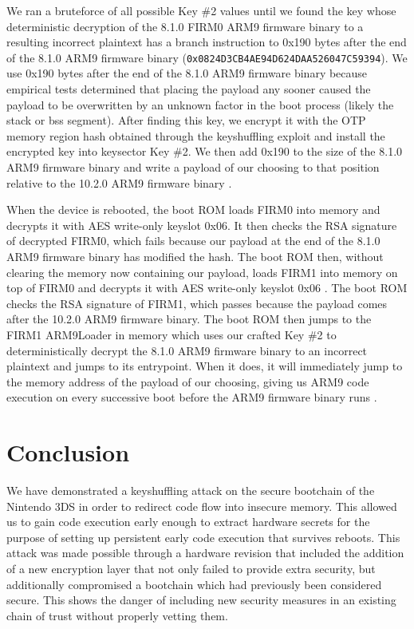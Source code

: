 \documentclass[journal]{IEEEtran}
\begin{document}
We ran a bruteforce of all possible Key \#2 values until we found the key whose
deterministic decryption of the 8.1.0 FIRM0 ARM9 firmware binary to a resulting
incorrect plaintext has a branch instruction to 0x190 bytes after the end of the
8.1.0 ARM9 firmware binary (\texttt{0x0824D3CB4AE94D624DAA526047C59394}). We use
0x190 bytes after the end of the 8.1.0 ARM9 firmware binary because empirical
tests determined that placing the payload any sooner caused the payload to be
overwritten by an unknown factor in the boot process (likely the stack or bss
segment). After finding this key, we encrypt it with the OTP memory region hash
obtained through the keyshuffling exploit and install the encrypted key into
keysector Key \#2. We then add 0x190 to the size of the 8.1.0 ARM9 firmware
binary and write a payload of our choosing to that position relative to the
10.2.0 ARM9 firmware binary \cite{32c3}.

When the device is rebooted, the boot ROM loads FIRM0 into memory and decrypts
it with AES write-only keyslot 0x06. It then checks the RSA signature of
decrypted FIRM0, which fails because our payload at the end of the 8.1.0 ARM9
firmware binary has modified the hash. The boot ROM then, without clearing the
memory now containing our payload, loads FIRM1 into memory on top of FIRM0 and
decrypts it with AES write-only keyslot 0x06 \cite{clevermind}. The boot ROM
checks the RSA signature of FIRM1, which passes because the payload comes after
the 10.2.0 ARM9 firmware binary. The boot ROM then jumps to the FIRM1 ARM9Loader
in memory which uses our crafted Key \#2 to deterministically decrypt the 8.1.0
ARM9 firmware binary to an incorrect plaintext and jumps to its entrypoint. When
it does, it will immediately jump to the memory address of the payload of our
choosing, giving us ARM9 code execution on every successive boot before the ARM9
firmware binary runs \cite{32c3}\cite{clevermind}.

\section{Conclusion}

We have demonstrated a keyshuffling attack on the secure bootchain of the
Nintendo 3DS in order to redirect code flow into insecure memory. This allowed
us to gain code execution early enough to extract hardware secrets for the
purpose of setting up persistent early code execution that survives reboots.
This attack was made possible through a hardware revision that included the
addition of a new encryption layer that not only failed to provide extra
security, but additionally compromised a bootchain which had previously been
considered secure. This shows the danger of including new security measures in
an existing chain of trust without properly vetting them.
\end{document}
